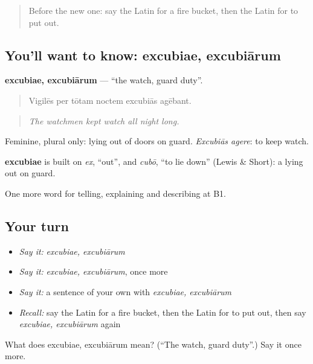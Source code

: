 \begin{quote}
Before the new one: say the Latin for a fire bucket, then the Latin for to put out.
\end{quote}

\subsection*{You'll want to know: excubiae, excubiārum}
\textbf{excubiae, excubiārum} — \textquotedblleft{}the watch, guard duty\textquotedblright{}.

\begin{quote}
Vigilēs per tōtam noctem excubiās agēbant.
\end{quote}

\begin{quote}
\emph{The watchmen kept watch all night long.}
\end{quote}

Feminine, plural only: lying out of doors on guard. \emph{Excubiās agere}: to keep watch.

\begin{cousinweb}
\textbf{excubiae} is built on \emph{ex}, \textquotedblleft{}out\textquotedblright{}, and \emph{cubō}, \textquotedblleft{}to lie down\textquotedblright{} (Lewis \& Short): a lying out on guard.
\end{cousinweb}

\begin{grammarlens}[title={What you've built}]
One more word for telling, explaining and describing at B1.
\end{grammarlens}

\subsection*{Your turn}
\begin{itemize}
\raggedright
  \item \emph{Say it:} \emph{excubiae, excubiārum}
  \item \emph{Say it:} \emph{excubiae, excubiārum}, once more
  \item \emph{Say it:} a sentence of your own with \emph{excubiae, excubiārum}
  \item \emph{Recall:} say the Latin for a fire bucket, then the Latin for to put out, then say \emph{excubiae, excubiārum} again
\end{itemize}

\begin{tcolorbox}[breakable,colback=teal!4,colframe=teal!35!black,title={Before you move on}]
What does excubiae, excubiārum mean? (\textquotedblleft{}The watch, guard duty\textquotedblright{}.) Say it once more.
\end{tcolorbox}
